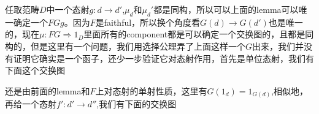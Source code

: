 \documentclass[UTF8,11pt,a4paper]{ctexart}
\newcommand{\To}{\Rightarrow}
\newcommand*{\xfunc}[4]{{#2}\colon{#3}{#1}{#4}}
\newcommand*{\func}[3]{\xfunc{\to}{#1}{#2}{#3}}
\newcommand*{\Func}[3]{\xfunc{\To}{#1}{#2}{#3}}
\begin{document}
\begin{center}		
\end{center}

任取范畴$D$中一个态射$\func{g}{d}{d'}$,$\mu_d$和$\mu_d'$都是同构，所以可以上面的lemma可以唯一确定一个$FGg$。因为$F$是faithful，所以换个角度看$G(d) \rightarrow G(d')$也是唯一的，现在$\Func{\mu}{FG}{1_D}$里面所有的component都是可以确定一个交换图的，且都是同构的，但是这里有一个问题，我们用选择公理弄了上面这样一个$G$出来，我们并没有证明它确实是一个函子，还少一步验证它对态射作用，首先是单位态射，我们有下面这个交换图
\begin{center}
\end{center}

还是由前面的lemma和$F$上对态射的单射性质，这里有$G(1_d) = 1_{G(d)}$,相似地，再给一个态射$\func{f'}{d'}{d''}$,我们有下面的交换图
\end{document}
